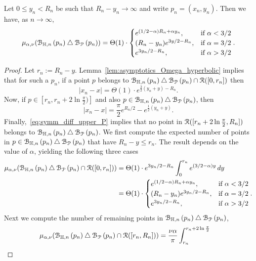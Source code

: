 \begin{lemma}\label{lem:sym_diff_measure_H_P}
Let $0 \le y_n <R_n$ be such that $R_n - y_n \to \infty$ and write $p_n = (x_n, y_n)$. Then we have, as $n \to \infty$,
\[
	\mu_{\alpha,\nu} ({\mathcal B}_{\mathbb{H},n}\left(p_n\right) \bigtriangleup {\mathcal B}_{{\mathcal P}}\left(p_n\right) ) 
	= \Theta (1) \cdot \begin{cases} 
		e^{(1/2-\alpha)R_n + \alpha y_n}, & \mbox{if } \alpha < 3/2 \\
		(R_n-y_n) e^{3y/2 - R_n}, & \mbox{if }\alpha = 3/2\\
		e^{3y_n/2 - R_n}, &  \mbox{if } \alpha > 3/2 
	\end{cases}.
\]
\end{lemma}

\begin{proof}
Let $r_n := R_n - y$. Lemma~\ref{lem:asymptotics_Omega_hyperbolic} implies that for such a $p_n$, if a point $p$ belongs to ${\mathcal B}_{\mathbb{H},n}\left(p_n\right) \bigtriangleup {\mathcal B}_{{\mathcal P}}\left(p_n\right) \cap {\mathcal R} ([0,r_n])$ then 
\[
	|x_n - x| = \Theta(1) \cdot e^{\frac{3}{2} (y_n + y) - R_n}.
\]
Now, if $p \in [r_n, r_n + 2 \ln \frac{\pi}{2})]$ and also $p \in {\mathcal B}_{\mathbb{H},n}\left(p_n\right) \bigtriangleup {\mathcal B}_{{\mathcal P}}\left(p_n\right)$, then 
\[
	|x_n-x| =\frac{\pi}{2} e^{R_n/2} - e^{\frac{1}{2} (y_n + y)}.
\]
Finally,~\eqref{eq:symm_diff_upper_P} implies that no point in ${\mathcal R} ([r_n+2\ln \frac{\pi}{2},R_n])$ belongs to ${\mathcal B}_{\mathbb{H},n}\left(p_n\right) \bigtriangleup {\mathcal B}_{{\mathcal P}}\left(p_n\right)$. We first compute the expected number of points in $p \in {\mathcal B}_{\mathbb{H},n}\left(p_n\right) \bigtriangleup {\mathcal B}_{{\mathcal P}}\left(p_n\right)$ that have $R_n - y \le r_n$. The result depends on the value of $\alpha$, yielding the following three cases
\begin{align*}
	\mu_{\alpha,\nu} ({\mathcal B}_{\mathbb{H},n}\left(p_n\right) \bigtriangleup {\mathcal B}_{{\mathcal P}}\left(p_n\right) \cap {\mathcal R} ([0,r_n])) 
	&= \Theta(1) \cdot e^{3y_n/2 - R_n}\int_0^{r_n} e^{(3/2-\alpha) y} \, dy \\
	&= \Theta(1)\cdot \begin{cases} e^{(1/2-\alpha)R_n + \alpha y_n}, & \mbox{if } \alpha < 3/2 \\
		(R_n - y_n) e^{3y_n/2 - R_n}, & \mbox{if }\alpha = 3/2\\
		e^{3y_n/2 - R_n}, &  \mbox{if } \alpha > 3/2
	\end{cases}.
\end{align*}
Next we compute the number of remaining points in ${\mathcal B}_{\mathbb{H},n}\left(p_n\right) \bigtriangleup {\mathcal B}_{{\mathcal P}}\left(p_n\right)$, 
\begin{align*}
	\mu_{\alpha,\nu} (\BallHyp{p_n} \bigtriangleup \BallPo{p_n} \cap \Rcal ([r_n, R_n])) 
	&= \frac{\nu\alpha}{\pi} \int_{r_n}^{r_n + 2 \ln \frac{\pi}{2}} 

\end{align*}
\end{proof}
